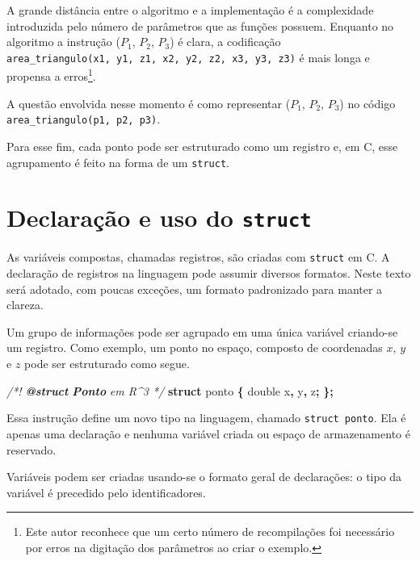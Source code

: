 \documentclass[
  11pt,
  a4paper,
]{scrbook}
\newenvironment{Shaded}{\begin{snugshade}}{\end{snugshade}}
\newcommand{\AnnotationTok}[1]{\textcolor[rgb]{0.56,0.35,0.01}{\textbf{\textit{#1}}}}
\newcommand{\CommentTok}[1]{\textcolor[rgb]{0.56,0.35,0.01}{\textit{#1}}}
\newcommand{\CommentVarTok}[1]{\textcolor[rgb]{0.56,0.35,0.01}{\textbf{\textit{#1}}}}
\newcommand{\DataTypeTok}[1]{\textcolor[rgb]{0.13,0.29,0.53}{#1}}
\newcommand{\KeywordTok}[1]{\textcolor[rgb]{0.13,0.29,0.53}{\textbf{#1}}}
\newcommand{\NormalTok}[1]{#1}
\newcommand{\OperatorTok}[1]{\textcolor[rgb]{0.81,0.36,0.00}{\textbf{#1}}}
\begin{document}
A grande distância entre o algoritmo e a implementação é a complexidade
introduzida pelo número de parâmetros que as funções possuem. Enquanto
no algoritmo a instrução (\(P_1\), \(P_2\),
\(P_3\)) é clara, a codificação
\texttt{area\_triangulo(x1,\ y1,\ z1,\ x2,\ y2,\ z2,\ x3,\ y3,\ z3)} é
mais longa e propensa a erros\footnote{Este autor reconhece que um certo
  número de recompilações foi necessário por erros na digitação dos
  parâmetros ao criar o exemplo.}.

A questão envolvida nesse momento é como representar
(\(P_1\), \(P_2\), \(P_3\)) no código
\texttt{area\_triangulo(p1,\ p2,\ p3)}.

Para esse fim, cada ponto pode ser estruturado como um registro e, em C,
esse agrupamento é feito na forma de um \texttt{struct}.

\section{\texorpdfstring{Declaração e uso do
\texttt{struct}}{Declaração e uso do struct}}\label{declarauxe7uxe3o-e-uso-do-struct}

As variáveis compostas, chamadas registros, são criadas com
\texttt{struct} em C. A declaração de registros na linguagem pode
assumir diversos formatos. Neste texto será adotado, com poucas
exceções, um formato padronizado para manter a clareza.

Um grupo de informações pode ser agrupado em uma única variável
criando-se um registro. Como exemplo, um ponto no espaço, composto de
coordenadas \(x\), \(y\) e \(z\) pode ser estruturado como segue.

\begin{Shaded}
\begin{Highlighting}[]
\CommentTok{/*! }\AnnotationTok{@struct}\CommentTok{ }\CommentVarTok{Ponto}\CommentTok{ em R\^{}3 */}
\KeywordTok{struct}\NormalTok{ ponto }\OperatorTok{\{}
    \DataTypeTok{double}\NormalTok{ x}\OperatorTok{,}\NormalTok{ y}\OperatorTok{,}\NormalTok{ z}\OperatorTok{;}
\OperatorTok{\};}
\end{Highlighting}
\end{Shaded}

Essa instrução define um novo tipo na linguagem, chamado
\texttt{struct\ ponto}. Ela é apenas uma declaração e nenhuma variável
criada ou espaço de armazenamento é reservado.

Variáveis podem ser criadas usando-se o formato geral de declarações: o
tipo da variável é precedido pelo identificadores.
\end{document}
